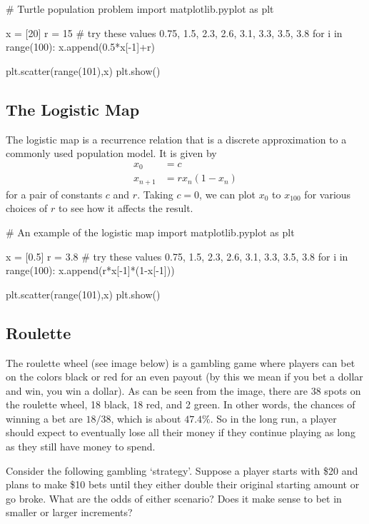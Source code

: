 \documentclass{ximera}
\begin{document}
\begin{sageCell}
# Turtle population problem
import matplotlib.pyplot as plt

x = [20]
r = 15 # try these values 0.75, 1.5, 2.3, 2.6, 3.1, 3.3, 3.5, 3.8
for i in range(100):
    x.append(0.5*x[-1]+r)
             
plt.scatter(range(101),x)
plt.show()
\end{sageCell}

\subsection{The Logistic Map}

The logistic map is a recurrence relation that is a discrete 
approximation to a commonly used population model. It is given by
\begin{align*}
	x_0 &= c\\
	x_{n+1} &= rx_n(1-x_n)
\end{align*}
for a pair of constants $c$ and $r$. Taking $c=0$, we can plot 
$x_0$ to $x_{100}$ for various choices of $r$ to see how it affects
the result. 

\begin{sageCell}
# An example of the logistic map
import matplotlib.pyplot as plt

x = [0.5]
r = 3.8 # try these values 0.75, 1.5, 2.3, 2.6, 3.1, 3.3, 3.5, 3.8
for i in range(100):
    x.append(r*x[-1]*(1-x[-1]))
             
plt.scatter(range(101),x)
plt.show()
\end{sageCell}

\subsection{Roulette}

The roulette wheel (see image below) is a gambling game where players
can bet on the colors black or red for an even payout (by this we mean
if you bet a dollar and win, you win a dollar). As can be seen from
the image, there are 38 spots on the roulette wheel, 18 black, 18 red,
and 2 green. In other words, the chances of winning a bet are $18/38$,
which is about $47.4\%$. So in the long run, a player should expect
to eventually lose all their money if they continue playing as long as
they still have money to spend.

Consider the following gambling `strategy'. Suppose a player starts
with \$20 and plans to make \$10 bets until they either double their
original starting amount or go broke. What are the odds of either 
scenario? Does it make sense to bet in smaller or larger increments?
\end{document}
